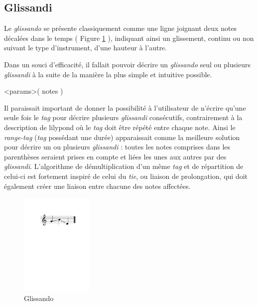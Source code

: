 \documentclass{article}
\newenvironment{gmncode}	{\vspace{-2mm}\small\verbatim}{\endverbatim\vspace{-2mm}}
\begin{document}
\subsection{Glissandi}\label{subsec:glissando}

Le \emph{glissando} se présente classiquement comme une ligne joignant deux notes décalées dans le temps ( Figure \ref{fig:glissandoSimple} ), indiquant ainsi un glissement, continu ou non suivant le type d'instrument, d'une hauteur à l'autre.

Dans un souci d'efficacité, il fallait pouvoir décrire un \emph{glissando} seul ou plusieurs \emph{glissandi} à la suite de la manière la plus simple et intuitive possible. 

\begin{gmncode}
\glissando<params>( notes )
\end{gmncode}

Il paraissait important de donner la possibilité à l'utilisateur de n'écrire qu'une seule fois le \emph{tag} pour décrire plusieurs \emph{glissandi} consécutifs, contrairement à la description de lilypond où le \emph{tag} doit être répété entre chaque note. Ainsi le \emph{range-tag} (\emph{tag} possédant une durée) apparaissait comme la meilleure solution pour décrire un ou plusieurs \emph{glissandi} : toutes les notes comprises dans les parenthèses seraient prises en compte et liées les unes aux autres par des \emph{glissandi}. L'algorithme de démultiplication d'un même \emph{tag} et de répartition de celui-ci est fortement inspiré de celui du \emph{tie}, ou liaison de prolongation, qui doit également créer une liaison entre chacune des notes affectées.
\\

\begin{figure}[h]
\centering

\begin{gmncode}
[ \glissando( g b d ) ]
\end{gmncode}

\includegraphics[width=35mm]{img/glissando1.pdf}
\caption{Glissando}
\label{fig:glissandoSimple}
\end{figure}
\end{document}
